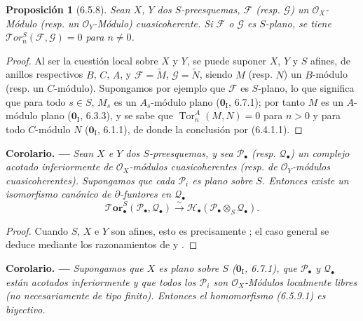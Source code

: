 \documentclass[10pt,oneside,openany]{book}
\makeatletter
\theoremstyle{egaenv}\newtheorem*{env}{---}
\theoremstyle{egastatement}
\newtheorem*{proposition}{Proposición}
\theoremstyle{egadescription}
\newenvironment{namedtheorem}[2][]{\par\medskip\noindent\setmanualcurrentlabel{#1}\textbf{#2\ifstrempty{#1}{}{ (#1)}. ---}\ifstrequal{#2}{Observación}{\normalfont}{\ifstrequal{#2}{Observaciones}{\normalfont}{\itshape}}}{\par\medskip}
\newcommand{\oldpage}[2][]{\marginnote{\normalfont\scriptsize\textbf{#1}\,|\,#2}\ignorespaces}
\newcommand{\setmanualcurrentlabel}[1]{\def\@currentlabel{#1}}
\makeatother
\begin{document}
\begin{proposition}[6.5.8]
Sean $X$, $Y$ dos $S$-preesquemas, $\mathscr F$ \textup{(resp.} $\mathscr G$\textup{)} un
$\mathscr O_X$-Módulo \textup{(resp.} un $\mathscr O_Y$-Módulo\textup{)} cuasicoherente. Si
$\mathscr F$ o $\mathscr G$ es $S$-plano, se tiene
$\mathscr{T}\!or_n^S(\mathscr F,\mathscr G)=0$ para $n\neq0$.
\end{proposition}

\begin{proof}
Al ser la cuestión local sobre $X$ y $Y$, se puede suponer $X$, $Y$ y $S$
afines, de anillos respectivos $B$, $C$, $A$, y
$\mathscr F=\widetilde M$, $\mathscr G=\widetilde N$, siendo $M$ (resp. $N$)
un $B$-módulo (resp. un $C$-módulo). Supongamos por ejemplo que $\mathscr F$
es $S$-plano, lo que significa que para todo $s\in S$, $M_s$ es un
$A_s$-módulo plano ($\mathbf{0}_{\mathrm I}$, 6.7.1); por tanto $M$ es un $A$-módulo plano
($\mathbf{0}_{\mathrm I}$, 6.3.3), y se sabe que
$\operatorname{Tor}_n^A(M,N)=0$ para $n>0$ y para todo $C$-módulo $N$
($\mathbf{0}_{\mathrm I}$, 6.1.1), de donde la conclusión por (6.4.1.1).
\end{proof}

\begin{namedtheorem}[6.5.9]{Corolario}
\label{III.6.5.9}
Sean $X$ e $Y$ dos $S$-preesquemas, y sea $\mathscr P_\bullet$
\textup{(resp.} $\mathscr Q_\bullet$\textup{)} un complejo
\oldpage[III]{151}
acotado
inferiormente de $\mathscr O_X$-módulos cuasicoherentes
\textup{(resp.} de $\mathscr O_Y$-módulos cuasicoherentes\textup{)}.
Supongamos que cada $\mathscr P_i$ es plano sobre $S$. Entonces existe
un isomorfismo canónico de $\partial$-funtores en $\mathscr Q_\bullet$
\[
  \boldsymbol{\mathscr{T}\!or}_\bullet^S(\mathscr P_\bullet,\mathscr Q_\bullet)
  \xrightarrow{\sim}
  \mathscr H_\bullet(\mathscr P_\bullet\otimes_S\mathscr Q_\bullet).
  \tag{6.5.9.1}\label{III.6.5.9.1.fr}
\]
\end{namedtheorem}

\begin{proof}
Cuando $S$, $X$ e $Y$ son afines, esto es precisamente
; el caso general se deduce mediante los
razonamientos de  y .
\end{proof}

\begin{namedtheorem}[6.5.10]{Corolario}
Supongamos que $X$ es plano sobre $S$ \textup{($\mathbf{0}_{\mathrm I}$, 6.7.1)}, que
$\mathscr P_\bullet$ y $\mathscr Q_\bullet$ están acotados inferiormente y
que todos los $\mathscr P_i$ son $\mathscr O_X$-Módulos localmente
libres (no necesariamente de tipo finito). Entonces el homomorfismo \textup{(6.5.9.1)} es
biyectivo.
\end{namedtheorem}
\end{document}
